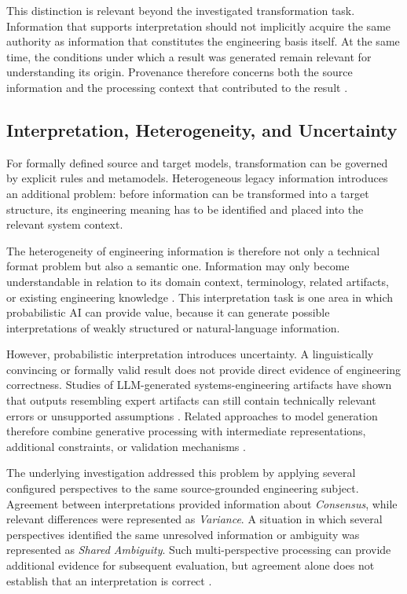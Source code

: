 This distinction is relevant beyond the investigated transformation task. Information that
supports interpretation should not implicitly acquire the same authority as information
that constitutes the engineering basis itself. At the same time, the conditions under which
a result was generated remain relevant for understanding its origin. Provenance therefore
concerns both the source information and the processing context that contributed to the
result \cite{MoreauMissier2013,Simmhan2005}.

\subsection{Interpretation, Heterogeneity, and Uncertainty}
\label{sec:challenge_interpretation}

For formally defined source and target models, transformation can be governed by explicit
rules and metamodels. Heterogeneous legacy information introduces an additional problem:
before information can be transformed into a target structure, its engineering meaning has
to be identified and placed into the relevant system context.

The heterogeneity of engineering information is therefore not only a technical format
problem but also a semantic one. Information may only become understandable in relation to
its domain context, terminology, related artifacts, or existing engineering knowledge
\cite{Bressan.2000}. This
interpretation task is one area in which probabilistic AI can provide value, because it can
generate possible interpretations of weakly structured or natural-language information.

However, probabilistic interpretation introduces uncertainty. A linguistically convincing
or formally valid result does not provide direct evidence of engineering correctness.
Studies of LLM-generated systems-engineering artifacts have shown that outputs resembling
expert artifacts can still contain technically relevant errors or unsupported assumptions
\cite{Topcu2025}. Related approaches to model generation therefore combine generative
processing with intermediate representations, additional constraints, or validation
mechanisms \cite{Cibrian.2025,Stein2026,Pan.2025}.

The underlying investigation addressed this problem by applying several configured
perspectives to the same source-grounded engineering subject. Agreement between
interpretations provided information about \emph{Consensus}, while relevant differences
were represented as \emph{Variance}. A situation in which several perspectives identified
the same unresolved information or ambiguity was represented as \emph{Shared Ambiguity}.
Such multi-perspective processing can provide additional evidence for subsequent evaluation,
but agreement alone does not establish that an interpretation is correct
\cite{Du2024,TriemDing2024}.


